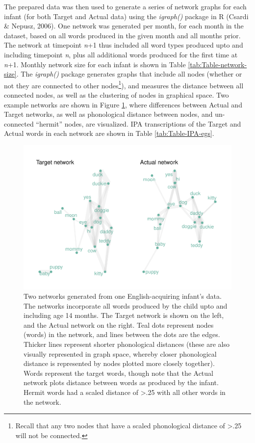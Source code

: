 \documentclass[
  man]{apa6}
\begin{document}
The prepared data was then used to generate a series of network graphs for each infant (for both Target and Actual data) using the \emph{igraph()} package in R (Csardi \& Nepusz, 2006). One network was generated per month, for each month in the dataset, based on all words produced in the given month and all months prior. The network at timepoint \emph{n}+1 thus included all word types produced upto and including timepoint \emph{n}, plus all additional words produced for the first time at \emph{n}+1. Monthly network size for each infant is shown in Table \ref{tab:Table-network-size}. The \emph{igraph()} package generates graphs that include all nodes (whether or not they are connected to other nodes\footnote{Recall that any two nodes that have a scaled phonological distance of \textgreater.25 will not be connected.}), and measures the distance between all connected nodes, as well as the clustering of nodes in graphical space. Two example networks are shown in Figure \ref{fig:Figure-network-graph}, where differences between Actual and Target networks, as well as phonological distance between nodes, and un-connected ``hermit'' nodes, are visualized. IPA transcriptions of the Target and Actual words in each network are shown in Table \ref{tab:Table-IPA-egs}.

\begin{figure}
\centering
\includegraphics{NetworkGraphs_R1_files/figure-latex/Figure-network-graph-1.pdf}
\caption{\label{fig:Figure-network-graph}Two networks generated from one English-acquiring infant's data. The networks incorporate all words produced by the child upto and including age 14 months. The Target network is shown on the left, and the Actual network on the right. Teal dots represent nodes (words) in the network, and lines between the dots are the edges. Thicker lines represent shorter phonological distances (these are also visually represented in graph space, whereby closer phonological distance is represented by nodes plotted more closely together). Words represent the target words, though note that the Actual network plots distance between words as produced by the infant. Hermit words had a scaled distance of \textgreater.25 with all other words in the network.}
\end{figure}
\end{document}
